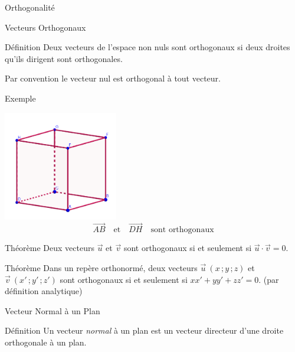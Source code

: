 \documentclass{cours}
\begin{document}
    \pagebreak
    \begin{Gpartie}{Orthogonalité} 
        \begin{Spartie}{Vecteurs Orthogonaux} 
            \begin{SSpartie}{Définition} 
                Deux vecteurs de l'espace non nuls sont orthogonaux si deux droites qu'ils dirigent sont orthogonales.

                Par convention le vecteur nul est orthogonal à tout vecteur.

                \begin{SSSpartie}{Exemple} 
                    \begin{center}
                            \includegraphics[width=5cm]{rsc/12fig2.png}
                            \[\overrightarrow{AB}\quad\text{et}\quad\overrightarrow{DH}\quad\text{sont orthogonaux}\]
                        \parbox{\linewidth}{}
                    \end{center}
                \end{SSSpartie}
            \end{SSpartie}
            \begin{SSpartie}{Théorème} 
                Deux vecteurs $\vec{u}$ et $\vec{v}$ sont orthogonaux si et seulement si $\vec{u}\cdot\vec{v}=0$.
            \end{SSpartie}
            \begin{SSpartie}{Théorème} 
                Dans un repère orthonormé, deux vecteurs $\vec{u}~\left(x\,;y\,;z\right)$ et $\vec{v}~\left(x'\,;y'\,;z'\right)$ sont orthogonaux si et seulement si $xx'+yy'+zz'=0$. \quad(par définition analytique)
            \end{SSpartie}
        \end{Spartie}
        \pagebreak
        \begin{Spartie}{Vecteur Normal à un Plan} 
            \begin{SSpartie}{Définition} 
                Un vecteur \emph{normal} à un plan est un vecteur directeur d'une droite orthogonale à un plan.
    

\end{SSpartie}
\end{Spartie}
\end{Gpartie}
\end{document}
